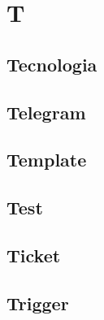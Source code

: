 \section{T} 
\subsection{Tecnologia} 

\subsection{Telegram} 

\subsection{Template} 

\subsection{Test} 

\subsection{Ticket} 

\subsection{Trigger} 

